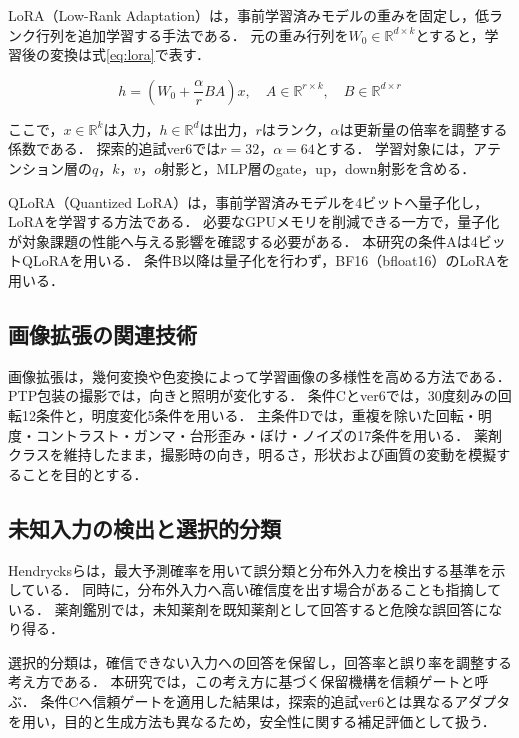 \documentclass[uplatex,dvipdfmx]{jsarticle}
\begin{document}
LoRA（Low-Rank Adaptation）は，事前学習済みモデルの重みを固定し，低ランク行列を追加学習する手法である\cite{hu2022lora}．
元の重み行列を$W_0 \in \mathbb{R}^{d \times k}$とすると，学習後の変換は式\eqref{eq:lora}で表す．

\begin{equation}
  h = \left(W_0 + \frac{\alpha}{r}BA\right)x,
  \quad
  A \in \mathbb{R}^{r \times k},
  \quad
  B \in \mathbb{R}^{d \times r}
  \label{eq:lora}
\end{equation}

ここで，$x \in \mathbb{R}^{k}$は入力，$h \in \mathbb{R}^{d}$は出力，$r$はランク，$\alpha$は更新量の倍率を調整する係数である．
探索的追試ver6では$r=32$，$\alpha=64$とする．
学習対象には，アテンション層の$q$，$k$，$v$，$o$射影と，MLP層のgate，up，down射影を含める．

QLoRA（Quantized LoRA）は，事前学習済みモデルを4ビットへ量子化し，LoRAを学習する方法である\cite{dettmers2023qlora}．
必要なGPUメモリを削減できる一方で，量子化が対象課題の性能へ与える影響を確認する必要がある．
本研究の条件Aは4ビットQLoRAを用いる．
条件B以降は量子化を行わず，BF16（bfloat16）のLoRAを用いる．

\subsection{画像拡張の関連技術}

画像拡張は，幾何変換や色変換によって学習画像の多様性を高める方法である\cite{shorten2019augmentation}．
PTP包装の撮影では，向きと照明が変化する．
条件Cとver6では，30度刻みの回転12条件と，明度変化5条件を用いる．
主条件Dでは，重複を除いた回転・明度・コントラスト・ガンマ・台形歪み・ぼけ・ノイズの17条件を用いる．
薬剤クラスを維持したまま，撮影時の向き，明るさ，形状および画質の変動を模擬することを目的とする．

\subsection{未知入力の検出と選択的分類}

Hendrycksらは，最大予測確率を用いて誤分類と分布外入力を検出する基準を示している\cite{hendrycks2017ood}．
同時に，分布外入力へ高い確信度を出す場合があることも指摘している．
薬剤鑑別では，未知薬剤を既知薬剤として回答すると危険な誤回答になり得る．

選択的分類は，確信できない入力への回答を保留し，回答率と誤り率を調整する考え方である\cite{geifman2017selective}．
本研究では，この考え方に基づく保留機構を信頼ゲートと呼ぶ．
条件Cへ信頼ゲートを適用した結果は，探索的追試ver6とは異なるアダプタを用い，目的と生成方法も異なるため，安全性に関する補足評価として扱う．
\end{document}
